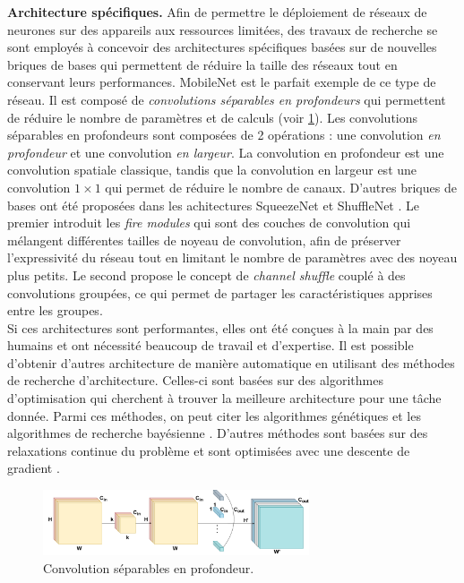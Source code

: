\noindent \textbf{Architecture spécifiques.} Afin de permettre le déploiement de
réseaux de neurones sur des appareils aux ressources limitées, des travaux de
recherche se sont employés à concevoir des architectures spécifiques basées sur
de nouvelles briques de bases qui permettent de réduire la taille des réseaux
tout en conservant leurs performances. MobileNet
\cite{DBLP:journals/corr/HowardZCKWWAA17} est le parfait exemple de ce type de
réseau. Il est composé de \emph{convolutions séparables en profondeurs} qui
permettent de réduire le nombre de paramètres et de calculs (voir
\cref{fig:dlo:depthwise_separable_conv}). Les convolutions séparables en
profondeurs sont composées de 2 opérations : une convolution \emph{en
  profondeur} et une convolution \emph{en largeur}. La convolution en profondeur
est une convolution spatiale classique, tandis que la convolution en largeur est
une convolution $1 \times 1$ qui permet de réduire le nombre de canaux. D'autres
briques de bases ont été proposées dans les achitectures SqueezeNet
\cite{DBLP:journals/corr/IandolaMAHDK16} et ShuffleNet
\cite{ZhangShuffleNet,MaShuffleNetV2}. Le premier introduit les \emph{fire
  modules} qui sont des couches de convolution qui mélangent différentes tailles
de noyeau de convolution, afin de préserver l'expressivité du réseau tout en
limitant le nombre de paramètres avec des noyeau plus petits. Le second propose
le concept de \emph{channel shuffle} couplé à des convolutions groupées, ce qui
permet de partager les caractéristiques apprises entre les groupes.\\

Si ces architectures sont performantes, elles ont été conçues à la main par des
humains et ont nécessité beaucoup de travail et d'expertise. Il est possible
d'obtenir d'autres architecture de manière automatique en utilisant des méthodes
de recherche d'architecture. Celles-ci sont basées sur des algorithmes
d'optimisation qui cherchent à trouver la meilleure architecture pour une tâche
donnée. Parmi ces méthodes, on peut citer les algorithmes génétiques
\cite{DBLP:conf/icml/RealMSSSTLK17} et les algorithmes de recherche bayésienne
\cite{DBLP:conf/nips/BergstraBBK11}. D'autres méthodes sont basées sur des
relaxations continue du problème et sont optimisées avec une descente de
gradient \cite{DBLP:conf/iclr/LiuSY19}.\\

\begin{figure}[htbp]
  \centering
  \includegraphics[width=0.7\textwidth]{./chapter_sota/assets/depthwise_sep_conv_scheme.pdf}
  \caption{Convolution séparables en profondeur.}
  \label{fig:dlo:depthwise_separable_conv}
\end{figure}

